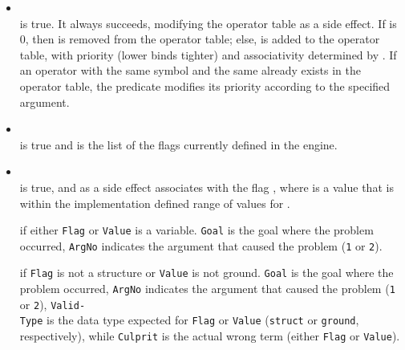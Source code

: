 \begin{itemize}

\item {}\\
    \noindent{} is true. It always succeeds,
    modifying the operator table as a side effect. If  is 0, then
     is removed from the operator table; else,  is
    added to the operator table, with priority (lower binds tighter) 
    and associativity determined by . If an operator with the same
     symbol and the same  already exists in the operator
    table, the predicate modifies its priority according to the specified  argument.


 \item {}\\
     \noindent{} is true and  is the list of the flags currently defined in the engine.


\item {}\\
    \noindent{} is true, and as a side effect associates  with the flag , where  is a value that is within the implementation defined range of values for .


     if either \texttt{Flag} or \texttt{Value} is a variable. \texttt{Goal} is the goal where the problem occurred, \texttt{ArgNo} indicates the argument that caused the problem (\texttt{1} or \texttt{2}).

     if \texttt{Flag} is not a structure or \texttt{Value} is not ground. \texttt{Goal} is the goal where the problem occurred, \texttt{ArgNo} indicates the argument that caused the problem (\texttt{1} or \texttt{2}), \texttt{Valid-}\\\texttt{Type} is the data type expected for \texttt{Flag} or \texttt{Value} (\texttt{struct} or \texttt{ground}, respectively), while \texttt{Culprit} is the actual wrong term (either \texttt{Flag} or \texttt{Value}).


\end{itemize}
